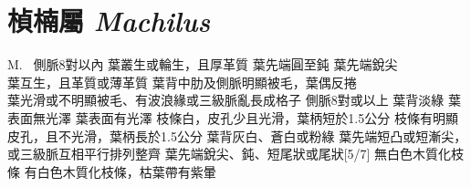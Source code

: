 \documentclass[12pt,a4paper]{article}
\begin{document}
\section{楨楠屬 \textit{Machilus}}
\begin{Key*}{M.~}
\indent\alter 側脈8對以內
    \alter 葉叢生或輪生，且厚革質
        \alter 葉先端圓至鈍
        \alter 葉先端銳尖\\
    \alter 葉互生，且革質或薄革質
        \alter 葉背中肋及側脈明顯被毛，葉偶反捲\\
        \alter 葉光滑或不明顯被毛、有波浪緣或三級脈亂長成格子
\alter 側脈8對或以上
    \alter 葉背淡綠
        \alter 葉表面無光澤
        \alter 葉表面有光澤
            \alter 枝條白，皮孔少且光滑，葉柄短於1.5公分
            \alter 枝條有明顯皮孔，且不光滑，葉柄長於1.5公分
    \alter 葉背灰白、蒼白或粉綠
        \alter 葉先端短凸或短漸尖，或三級脈互相平行排列整齊
        \alter 葉先端銳尖、鈍、短尾狀或尾狀[5/7]
             \alter 無白色木質化枝條%
             \alter 有白色木質化枝條，枯葉帶有紫暈%
    
\end{Key*}
\end{document}
